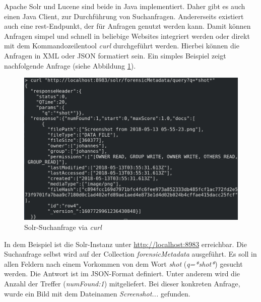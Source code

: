 \noindent
Apache Solr und Lucene sind beide in Java implementiert. Daher gibt es auch einen Java Client, zur Durchführung von Suchanfragen. Andererseits existiert auch eine \gls{rest}-Endpunkt, der für Anfragen genutzt werden kann. Damit können Anfragen simpel und schnell in beliebige Websites integriert werden oder direkt mit dem Kommandozeilentool \textit{curl} durchgeführt werden. Hierbei können die Anfragen in XML oder JSON formatiert sein. Ein simples Beispiel zeigt nachfolgende Anfrage (siehe Abbildung \ref{fig:solr_request}).\\

\begin{figure}[ht]
  \centering
  \includegraphics[width=\textwidth]{./resource/solr_request.png}
  \caption{Solr-Suchanfrage via \textit{curl}}
  \label{fig:solr_request}
\end{figure}

\noindent
In dem Beispiel ist die Solr-Instanz unter \url{http://localhost:8983} erreichbar. Die Suchanfrage selbst wird auf der Collection \textit{forensicMetadata} ausgeführt. Es soll in allen Feldern nach einem Vorkommen von dem Wort \textit{shot} (\textit{q=*shot*}) gesucht werden. Die Antwort ist im JSON-Format definiert. Unter anderem wird die Anzahl der Treffer (\textit{numFound:1}) mitgeliefert. Bei dieser konkreten Anfrage, wurde ein Bild mit dem Dateinamen \textit{Screenshot...} gefunden. 